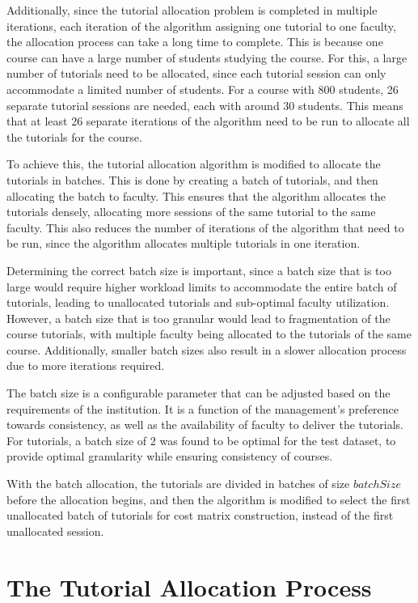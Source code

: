 Additionally, since the tutorial allocation problem is completed in multiple iterations, each iteration of the algorithm assigning one tutorial to one faculty, the allocation process can take a long time to complete. This is because one course can have a large number of students studying the course. For this, a large number of tutorials need to be allocated, since each tutorial session can only accommodate a limited number of students. For a course with 800 students, 26 separate tutorial sessions are needed, each with around 30 students. This means that at least 26 separate iterations of the algorithm need to be run to allocate all the tutorials for the course.

To achieve this, the tutorial allocation algorithm is modified to allocate the tutorials in batches. This is done by creating a batch of tutorials, and then allocating the batch to faculty. This ensures that the algorithm allocates the tutorials densely, allocating more sessions of the same tutorial to the same faculty. This also reduces the number of iterations of the algorithm that need to be run, since the algorithm allocates multiple tutorials in one iteration.

Determining the correct batch size is important, since a batch size that is too large would require higher workload limits to accommodate the entire batch of tutorials, leading to unallocated tutorials and sub-optimal faculty utilization. However, a batch size that is too granular would lead to fragmentation of the course tutorials, with multiple faculty being allocated to the tutorials of the same course. Additionally, smaller batch sizes also result in a slower allocation process due to more iterations required.

The batch size is a configurable parameter that can be adjusted based on the requirements of the institution. It is a function of the management's preference towards consistency, as well as the availability of faculty to deliver the tutorials. For tutorials, a batch size of 2 was found to be optimal for the test dataset, to provide optimal granularity while ensuring consistency of courses.

With the batch allocation, the tutorials are divided in batches of size $batchSize$ before the allocation begins, and then the algorithm is modified to select the first unallocated batch of tutorials for cost matrix construction, instead of the first unallocated session.


\section{The Tutorial Allocation Process}

